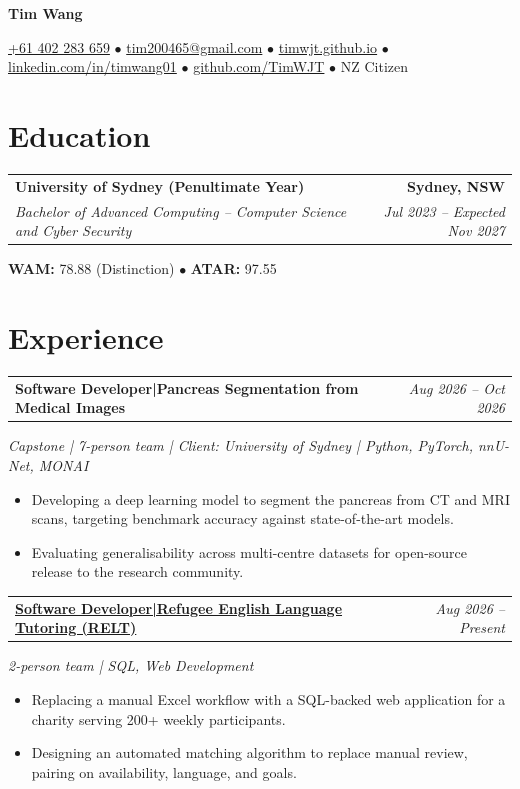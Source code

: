 \documentclass[10pt,a4paper]{article}
\makeatletter
\newcommand{\educationentry}[4]{%
  \begin{tabularx}{\textwidth}{@{}Xr@{}}
    \textbf{#1} & \textbf{#2} \\
    \textit{#3} & \textit{#4}
  \end{tabularx}\vspace{1pt}
}
\newcommand{\project}[3]{%
  \vspace{6pt}
  \begin{tabularx}{\textwidth}{@{}Xr@{}}
    \textbf{#1\enspace|\enspace#2} & \textit{#3}
  \end{tabularx}\vspace{-1pt}
}
\newcommand{\linkedproject}[4]{%
  \vspace{6pt}
  \begin{tabularx}{\textwidth}{@{}Xr@{}}
    \textbf{\href{#1}{#2\enspace|\enspace#3}} & \textit{#4}
  \end{tabularx}\vspace{-1pt}
}
\newcommand{\projectcontext}[1]{%
  \textit{#1}\par\vspace{-1pt}
}
\makeatother
\begin{document}
\fontsize{9.6pt}{10.8pt}\selectfont

\begin{center}
  {\LARGE\bfseries Tim Wang}\\[4pt]
  {\fontsize{9pt}{10pt}\selectfont
  \href{tel:+61402283659}{+61 402 283 659}
  \enspace$\bullet$\enspace
  \href{mailto:tim200465@gmail.com}{tim200465@gmail.com}
  \enspace$\bullet$\enspace
  \href{https://timwjt.github.io}{timwjt.github.io}
  \enspace$\bullet$\enspace
  \href{https://www.linkedin.com/in/timwang01}{linkedin.com/in/timwang01}
  \enspace$\bullet$\enspace
  \href{https://github.com/TimWJT}{github.com/TimWJT}
  \enspace$\bullet$\enspace
  NZ Citizen\par}
\end{center}
\vspace{-7pt}

\section{Education}
\educationentry
  {University of Sydney (Penultimate Year)}
  {Sydney, NSW}
  {Bachelor of Advanced Computing -- Computer Science and Cyber Security}
  {Jul 2023 -- Expected Nov 2027}
\textbf{WAM:} 78.88 (Distinction)
\enspace$\bullet$\enspace
\textbf{ATAR:} 97.55

\section{Experience}

\project
  {Software Developer}
  {Pancreas Segmentation from Medical Images}
  {Aug 2026 -- Oct 2026}
\projectcontext{Capstone | 7-person team | Client: University of Sydney | Python, PyTorch, nnU-Net, MONAI}
\begin{itemize}
  \item Developing a deep learning model to segment the pancreas from CT and MRI scans, targeting benchmark accuracy against state-of-the-art models.
  \item Evaluating generalisability across multi-centre datasets for open-source release to the research community.
\end{itemize}

\linkedproject
  {https://www.reltutoring.org/}
  {Software Developer}
  {Refugee English Language Tutoring (RELT)}
  {Aug 2026 -- Present}
\projectcontext{2-person team | SQL, Web Development}
\begin{itemize}
  \item Replacing a manual Excel workflow with a SQL-backed web application for a charity serving 200+ weekly participants.
  \item Designing an automated matching algorithm to replace manual review, pairing on availability, language, and goals.
\end{itemize}
\end{document}
